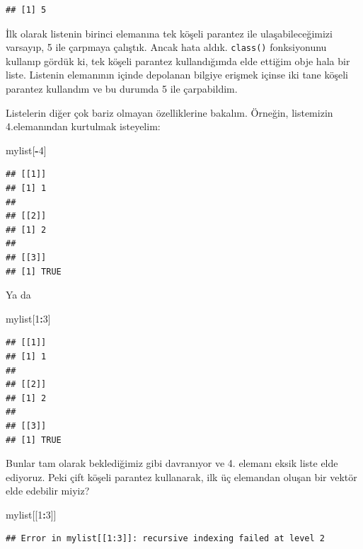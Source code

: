 \documentclass[]{book}
\newenvironment{Shaded}{\begin{snugshade}}{\end{snugshade}}
\newcommand{\DecValTok}[1]{\textcolor[rgb]{0.00,0.00,0.81}{#1}}
\newcommand{\NormalTok}[1]{#1}
\newcommand{\OperatorTok}[1]{\textcolor[rgb]{0.81,0.36,0.00}{\textbf{#1}}}
\begin{document}
\begin{verbatim}
## [1] 5
\end{verbatim}

İlk olarak listenin birinci elemanına tek köşeli parantez ile
ulaşabileceğimizi varsayıp, 5 ile çarpmaya çalıştık. Ancak hata aldık.
\texttt{class()} fonksiyonunu kullanıp gördük ki, tek köşeli parantez
kullandığımda elde ettiğim obje hala bir liste. Listenin elemanının
içinde depolanan bilgiye erişmek içinse iki tane köşeli parantez
kullandım ve bu durumda 5 ile çarpabildim.

Listelerin diğer çok bariz olmayan özelliklerine bakalım. Örneğin,
listemizin 4.elemanından kurtulmak isteyelim:

\begin{Shaded}
\begin{Highlighting}[]
\NormalTok{mylist[}\OperatorTok{-}\DecValTok{4}\NormalTok{]}
\end{Highlighting}
\end{Shaded}

\begin{verbatim}
## [[1]]
## [1] 1
## 
## [[2]]
## [1] 2
## 
## [[3]]
## [1] TRUE
\end{verbatim}

Ya da

\begin{Shaded}
\begin{Highlighting}[]
\NormalTok{mylist[}\DecValTok{1}\OperatorTok{:}\DecValTok{3}\NormalTok{]}
\end{Highlighting}
\end{Shaded}

\begin{verbatim}
## [[1]]
## [1] 1
## 
## [[2]]
## [1] 2
## 
## [[3]]
## [1] TRUE
\end{verbatim}

Bunlar tam olarak beklediğimiz gibi davranıyor ve 4. elemanı eksik liste
elde ediyoruz. Peki çift köşeli parantez kullanarak, ilk üç elemandan
oluşan bir vektör elde edebilir miyiz?

\begin{Shaded}
\begin{Highlighting}[]
\NormalTok{mylist[[}\DecValTok{1}\OperatorTok{:}\DecValTok{3}\NormalTok{]]}
\end{Highlighting}
\end{Shaded}

\begin{verbatim}
## Error in mylist[[1:3]]: recursive indexing failed at level 2
\end{verbatim}
\end{document}
